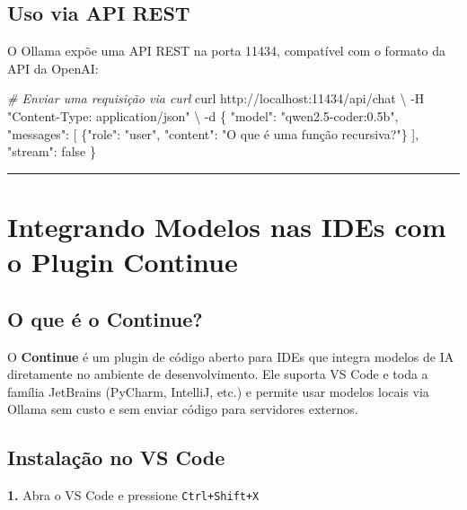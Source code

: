 \documentclass[
]{article}
\newenvironment{Shaded}{\begin{snugshade}}{\end{snugshade}}
\newcommand{\AttributeTok}[1]{\textcolor[rgb]{0.13,0.29,0.53}{#1}}
\newcommand{\CommentTok}[1]{\textcolor[rgb]{0.56,0.35,0.01}{\textit{#1}}}
\newcommand{\DataTypeTok}[1]{\textcolor[rgb]{0.13,0.29,0.53}{#1}}
\newcommand{\ExtensionTok}[1]{#1}
\newcommand{\NormalTok}[1]{#1}
\newcommand{\StringTok}[1]{\textcolor[rgb]{0.31,0.60,0.02}{#1}}
\begin{document}
\subsection{Uso via API REST}\label{uso-via-api-rest}

O Ollama expõe uma API REST na porta 11434, compatível com o formato da
API da OpenAI:

\begin{Shaded}
\begin{Highlighting}[]
\CommentTok{\# Enviar uma requisição via curl}
\ExtensionTok{curl}\NormalTok{ http://localhost:11434/api/chat }\DataTypeTok{\textbackslash{}}
  \AttributeTok{{-}H} \StringTok{"Content{-}Type: application/json"} \DataTypeTok{\textbackslash{}}
  \AttributeTok{{-}d} \StringTok{\textquotesingle{}\{}
\StringTok{    "model": "qwen2.5{-}coder:0.5b",}
\StringTok{    "messages": [}
\StringTok{      \{"role": "user", "content": "O que é uma função recursiva?"\}}
\StringTok{    ],}
\StringTok{    "stream": false}
\StringTok{  \}\textquotesingle{}}
\end{Highlighting}
\end{Shaded}

\begin{center}\rule{0.5\linewidth}{0.5pt}\end{center}

\section{Integrando Modelos nas IDEs com o Plugin
Continue}\label{integrando-modelos-nas-ides-com-o-plugin-continue}

\subsection{O que é o Continue?}\label{o-que-uxe9-o-continue}

O \textbf{Continue} é um plugin de código aberto para IDEs que integra
modelos de IA diretamente no ambiente de desenvolvimento. Ele suporta VS
Code e toda a família JetBrains (PyCharm, IntelliJ, etc.) e permite usar
modelos locais via Ollama sem custo e sem enviar código para servidores
externos.

\subsection{Instalação no VS Code}\label{instalauxe7uxe3o-no-vs-code}

\textbf{1.} Abra o VS Code e pressione \texttt{Ctrl+Shift+X}
\end{document}
